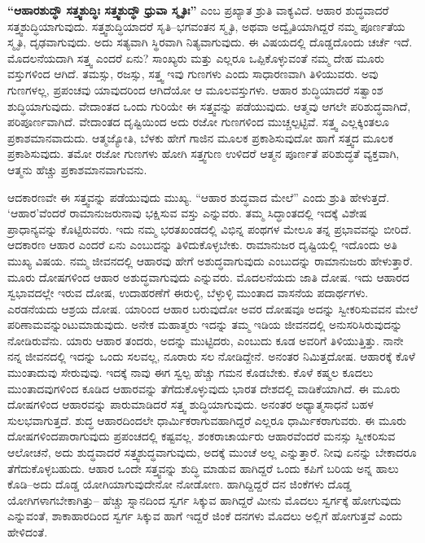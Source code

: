 \textbf{“ಆಹಾರಶುದ್ಧೌ ಸತ್ತ್ವಶುದ್ಧಿಃ ಸತ್ತ್ವಶುದ್ಧೌ ಧ್ರುವಾ ಸ್ಮೃತಿಃ”} ಎಂಬ ಪ್ರಖ್ಯಾತ ಶ್ರುತಿ ವಾಕ್ಯವಿದೆ. ಆಹಾರ ಶುದ್ಧವಾದರೆ ಸತ್ತ್ವಶುದ್ಧಿಯಾಗುವುದು. ಸತ್ತ್ವಶುದ್ಧಿಯಾದರೆ ಸೃತಿ–ಭಗವಂತನ ಸ್ಮೃತಿ, ಅಥವಾ ಅದ್ವೈತಿಯಾಗಿದ್ದರೆ ನಮ್ಮ ಪೂರ್ಣತೆಯ ಸ್ಮೃತಿ, ದೃಢವಾಗುವುದು. ಅದು ಸತ್ಯವಾಗಿ ಸ್ಥಿರವಾಗಿ ನಿತ್ಯವಾಗುವುದು. ಈ ವಿಷಯದಲ್ಲಿ ದೊಡ್ಡದೊಂದು ಚರ್ಚೆ ಇದೆ. ಮೊದಲನೆಯದಾಗಿ ಸತ್ತ್ವ ಎಂದರೆ ಏನು? ಸಾಂಖ್ಯರು ಮತ್ತು ಎಲ್ಲರೂ ಒಪ್ಪಿಕೊಳ್ಳುವಂತೆ ನಮ್ಮ ದೇಹ ಮೂರು ವಸ್ತುಗಳಿಂದ ಆಗಿದೆ. ತಮಸ್ಸು, ರಜಸ್ಸು, ಸತ್ತ್ವ ಇವು ಗುಣಗಳು ಎಂದು ಸಾಧಾರಣವಾಗಿ ತಿಳಿಯುವರು. ಅವು ಗುಣಗಳಲ್ಲ, ಪ್ರಪಂಚವು ಯಾವುದರಿಂದ ಆಗಿದೆಯೋ ಆ ಮೂಲವಸ್ತುಗಳು. ಆಹಾರ ಶುದ್ಧಿಯಾದರೆ ಸತ್ವಾಂಶ ಶುದ್ಧಿಯಾಗುವುದು. ವೇದಾಂತದ ಒಂದು ಗುರಿಯೇ ಈ ಸತ್ತ್ವವನ್ನು ಪಡೆಯುವುದು. ಆತ್ಮವು ಆಗಲೇ ಪರಿಶುದ್ಧವಾಗಿದೆ, ಪರಿಪೂರ್ಣವಾಗಿದೆ. ವೇದಾಂತದ ದೃಷ್ಟಿಯಿಂದ ಅದು ರಜೋ ಗುಣಗಳಿಂದ ಮುಚ್ಚಲ್ಪಟ್ಟಿವೆ. ಸತ್ತ್ವ ಎಲ್ಲಕ್ಕಿಂತಲೂ ಪ್ರಕಾಶಮಾನವಾದುದು. ಆತ್ಮಜ್ಯೋತಿ, ಬೆಳಕು ಹೇಗೆ ಗಾಜಿನ ಮೂಲಕ ಪ್ರಕಾಶಿಸುವುದೋ ಹಾಗೆ ಸತ್ತ್ವದ ಮೂಲಕ ಪ್ರಕಾಶಿಸುವುದು. ತಮೋ ರಜೋ ಗುಣಗಳು ಹೋಗಿ ಸತ್ತ್ವಗುಣ ಉಳಿದರೆ ಆತ್ಮನ ಪೂರ್ಣತೆ ಪರಿಶುದ್ಧತೆ ವ್ಯಕ್ತವಾಗಿ, ಆತ್ಮನು ಹೆಚ್ಚು ಪ್ರಕಾಶಮಾನವಾಗುವನು.

ಆದಕಾರಣವೇ ಈ ಸತ್ತ್ವವನ್ನು ಪಡೆಯುವುದು ಮುಖ್ಯ. “ಆಹಾರ ಶುದ್ಧವಾದ ಮೇಲೆ” ಎಂದು ಶ್ರುತಿ ಹೇಳುತ್ತದೆ. ‘ಆಹಾರ’ವೆಂದರೆ ರಾಮಾನುಜರು\break ನಾವು ಭಕ್ಷಿಸುವ ವಸ್ತು ಎನ್ನುವರು. ತಮ್ಮ ಸಿದ್ಧಾಂತದಲ್ಲಿ ಇದಕ್ಕೆ ವಿಶೇಷ ಪ್ರಾಧಾನ್ಯವನ್ನು ಕೊಟ್ಟಿರುವರು. ಇದು ನಮ್ಮ ಭರತಖಂಡದಲ್ಲಿ ವಿಭಿನ್ನ ಪಂಥಗಳ ಮೇಲೂ ತನ್ನ ಪ್ರಭಾವವನ್ನು ಬೀರಿದೆ. ಆದಕಾರಣ ಆಹಾರ ಎಂದರೆ ಏನು ಎಂಬುದನ್ನು ತಿಳಿದುಕೊಳ್ಳಬೇಕು. ರಾಮಾನುಜರ ದೃಷ್ಟಿಯಲ್ಲಿ ಇದೊಂದು ಅತಿ ಮುಖ್ಯ ವಿಷಯ. ನಮ್ಮ ಜೀವನದಲ್ಲಿ ಆಹಾರವು ಹೇಗೆ ಅಶುದ್ಧವಾಗುವುದು ಎಂಬುದನ್ನು ರಾಮಾನುಜರು ಹೇಳುತ್ತಾರೆ. ಮೂರು ದೋಷಗಳಿಂದ ಆಹಾರ ಅಶುದ್ಧವಾಗುವುದು ಎನ್ನುವರು. ಮೊದಲನೆಯದು ಜಾತಿ ದೋಷ. ಇದು ಆಹಾರದ ಸ್ವಭಾವದಲ್ಲೇ ಇರುವ ದೋಷ, ಉದಾಹರಣೆಗೆ ಈರುಳ್ಳಿ, ಬೆಳ್ಳುಳ್ಳಿ ಮುಂತಾದ ವಾಸನೆಯ ಪದಾರ್ಥಗಳು. ಎರಡನೆಯದು ಆಶ್ರಯ ದೋಷ. ಯಾರಿಂದ ಆಹಾರ ಬರುವುದೋ ಅವರ ದೋಷವೂ ಅದನ್ನು ಸ್ವೀಕರಿಸು\-ವವನ ಮೇಲೆ ಪರಿಣಾಮವನ್ನುಂಟುಮಾಡುವುದು. ಅನೇಕ ಮಹಾತ್ಮರು ಇದನ್ನು ತಮ್ಮ ಇಡಿಯ ಜೀವನದಲ್ಲಿ ಅನುಸರಿಸಿರುವುದನ್ನು ನೋಡಿರುವೆನು. ಯಾರು ಆಹಾರ ತಂದರು, ಅದನ್ನು ಮುಟ್ಟಿದರು, ಎಂಬುದು ಕೂಡ ಅವರಿಗೆ ತಿಳಿಯುತ್ತಿತ್ತು. ನಾನೇ ನನ್ನ ಜೀವನದಲ್ಲಿ ಇದನ್ನು ಒಂದು ಸಲವಲ್ಲ, ನೂರಾರು ಸಲ ನೋಡಿದ್ದೇನೆ. ಅನಂತರ ನಿಮಿತ್ತದೋಷ. ಆಹಾರಕ್ಕೆ ಕೊಳೆ ಮುಂತಾದುವು ಸೇರುವುವು. ಇದಕ್ಕೆ ನಾವು ಈಗ ಸ್ವಲ್ಪ ಹೆಚ್ಚು ಗಮನ ಕೊಡಬೇಕು. ಕೊಳೆ ಕಷ್ಮಲ ಕೂದಲು ಮುಂತಾದವುಗಳಿಂದ ಕೂಡಿದ ಆಹಾರವನ್ನು ತೆಗೆದುಕೊಳ್ಳುವುದು ಭಾರತ ದೇಶದಲ್ಲಿ ವಾಡಿಕೆಯಾಗಿದೆ. ಈ ಮೂರು ದೋಷಗಳಿಂದ ಆಹಾರವನ್ನು ಪಾರುಮಾಡಿದರೆ ಸತ್ತ್ವ ಶುದ್ಧಿಯಾಗುವುದು. ಅನಂತರ ಅಧ್ಯಾತ್ಮ\break ಸಾಧನೆ ಬಹಳ ಸುಲಭವಾಗುತ್ತದೆ. ಶುದ್ಧ ಆಹಾರದಿಂದಲೇ ಧಾರ್ಮಿಕ\-ರಾಗುವ\break ಹಾಗಿದ್ದರೆ ಎಲ್ಲರೂ ಧಾರ್ಮಿಕರಾಗುವರು. ಈ ಮೂರು ದೋಷಗಳಿಂದ\break ಪಾರಾಗುವುದು ಪ್ರಪಂಚದಲ್ಲಿ ಕಷ್ಟವಲ್ಲ. ಶಂಕರಾಚಾರ್ಯರು ಆಹಾರ\break ವೆಂದರೆ ಮನಸ್ಸು ಸ್ವೀಕರಿಸುವ ಆಲೋಚನೆ, ಅದು ಶುದ್ಧವಾದರೆ ಸತ್ತ್ವ\break ಶುದ್ಧವಾಗುವುದು, ಅದಕ್ಕೆ ಮುಂಚೆ ಅಲ್ಲ ಎನ್ನುತ್ತಾರೆ. ನೀವು ಏನನ್ನು ಬೇಕಾದರೂ ತೆಗೆದುಕೊಳ್ಳಬಹುದು. ಆಹಾರ ಒಂದೇ ಸತ್ತ್ವವನ್ನು ಶುದ್ಧಿ ಮಾಡುವ ಹಾಗಿದ್ದರೆ ಒಂದು ಕಪಿಗೆ ಬರಿಯ ಅನ್ನ ಹಾಲು ಕೊಡಿ–ಅದು ದೊಡ್ಡ ಯೋಗಿಯಾಗುವುದೇನೋ ನೋಡೋಣ. ಹಾಗಿದ್ದಿದ್ದರೆ ದನ ಜಿಂಕೆಗಳು ದೊಡ್ಡ ಯೋಗಿಗಳಾಗಬೇಕಾಗಿತ್ತು– ಹೆಚ್ಚು ಸ್ನಾನದಿಂದ ಸ್ವರ್ಗ ಸಿಕ್ಕುವ ಹಾಗಿದ್ದರೆ ಮೀನು ಮೊದಲು ಸ್ವರ್ಗಕ್ಕೆ ಹೋಗುವುದು ಎನ್ನುವಂತೆ, ಶಾಕಾಹಾರದಿಂದ ಸ್ವರ್ಗ ಸಿಕ್ಕುವ ಹಾಗೆ ಇದ್ದರೆ ಜಿಂಕೆ ದನಗಳು ಮೊದಲು ಅಲ್ಲಿಗೆ ಹೋಗುತ್ತವೆ ಎಂದು ಹೇಳಿದಂತೆ.

